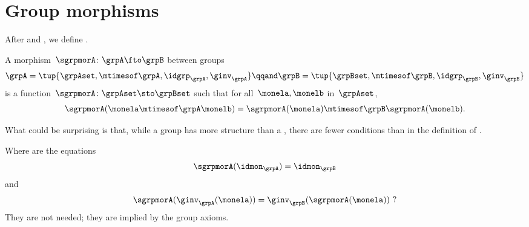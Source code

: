\section{Group morphisms}

After  and , we define .


\begin{ctdefinition}
    \label{def:group-mor}
    A morphism~$\sgrpmorA\colon \grpA \fto \grpB$ between groups
    \begin{equation}
        \grpA = \tup{\grpAset, \mtimesof\grpA, \idgrp_\grpA, \ginv_\grpA}
        \qqand
        \grpB = \tup{\grpBset, \mtimesof\grpB, \idgrp_\grpB,  \ginv_\grpB}
    \end{equation}
    is a function~$\sgrpmorA \colon \grpAset \sto \grpBset$ such that for all~$\monela, \monelb$ in~$\grpAset$,
    \begin{equation}
        \label{eq:group-mor-comp}
        \sgrpmorA (\monela \mtimesof\grpA \monelb) = \sgrpmorA (\monela) \mtimesof\grpB  \sgrpmorA(\monelb).
    \end{equation}
\end{ctdefinition}

What could be surprising is that, while a group has more structure than a , there are fewer conditions than in the definition of .

Where are the equations
\begin{equation}
    \label{eq:grp-id-comp}
    \sgrpmorA (\idmon_\grpA) = \idmon_{\grpB}
\end{equation}
and
\begin{equation}
    \label{eq:grp-inv-comp}
    \sgrpmorA (\ginv_\grpA(\monela)) = \ginv_\grpB(\sgrpmorA(\monela)) \ ?
\end{equation}
%
They are not needed; they are implied by the group axioms.


